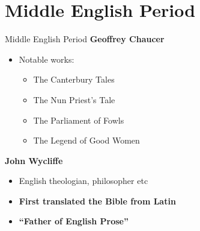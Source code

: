 \documentclass[
  12pt,
    progressbar=frametitle]{beamer}
\providecommand{\tightlist}{%
  \setlength{\itemsep}{0pt}\setlength{\parskip}{0pt}}
\begin{document}
\section{Middle English Period}
\begin{frame}[allowframebreaks]
{Middle English Period}
\large\textbf{Geoffrey Chaucer}\normalsize\vspace{-3mm}

\begin{itemize}
\tightlist
\item
  Notable works:

  \begin{itemize}
  \tightlist
  \item
    The Canterbury Tales
  \item
    The Nun Priest's Tale
  \item
    The Parliament of Fowls
  \item
    The Legend of Good Women
  \end{itemize}
\end{itemize}

\large\textbf{John Wycliffe}\normalsize\vspace{-3mm}

\begin{itemize}
\tightlist
\item
  English theologian, philosopher etc
\item
  \textbf{First translated the Bible from Latin}
\item
  \textbf{``Father of English Prose''}
\end{itemize}

\end{frame}
\end{document}
